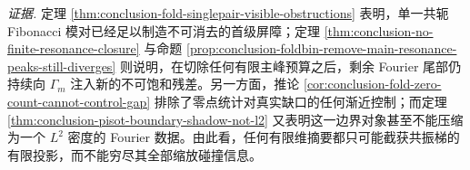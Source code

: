 \noindent\emph{证据.}
定理 \ref{thm:conclusion-fold-singlepair-visible-obstructions} 表明，单一共轭 Fibonacci 模对已经足以制造不可消去的首级屏障；定理 \ref{thm:conclusion-no-finite-resonance-closure} 与命题 \ref{prop:conclusion-foldbin-remove-main-resonance-peaks-still-diverges} 则说明，在切除任何有限主峰预算之后，剩余 Fourier 尾部仍持续向 \(\Gamma_m\) 注入新的不可饱和残差。另一方面，推论 \ref{cor:conclusion-fold-zero-count-cannot-control-gap} 排除了零点统计对真实缺口的任何渐近控制；而定理 \ref{thm:conclusion-pisot-boundary-shadow-not-l2} 又表明这一边界对象甚至不能压缩为一个 \(L^2\) 密度的 Fourier 数据。由此看，任何有限维摘要都只可能截获共振梯的有限投影，而不能穷尽其全部缩放碰撞信息。

